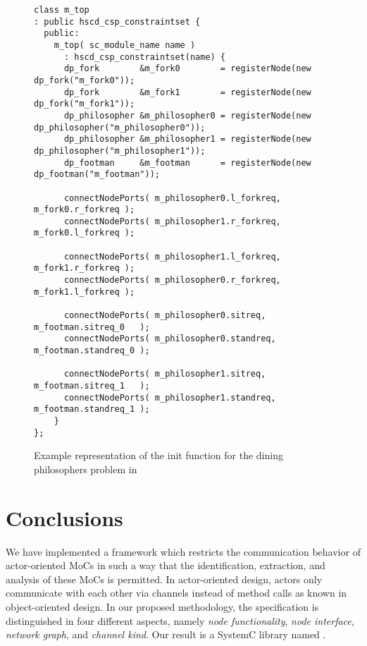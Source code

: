 \begin{figure}
\centering
\begin{verbatim}
class m_top
: public hscd_csp_constraintset {
  public:
    m_top( sc_module_name name )
      : hscd_csp_constraintset(name) {
      dp_fork        &m_fork0        = registerNode(new dp_fork("m_fork0"));
      dp_fork        &m_fork1        = registerNode(new dp_fork("m_fork1"));
      dp_philosopher &m_philosopher0 = registerNode(new dp_philosopher("m_philosopher0"));
      dp_philosopher &m_philosopher1 = registerNode(new dp_philosopher("m_philosopher1"));
      dp_footman     &m_footman      = registerNode(new dp_footman("m_footman"));
      
      connectNodePorts( m_philosopher0.l_forkreq, m_fork0.r_forkreq );
      connectNodePorts( m_philosopher1.r_forkreq, m_fork0.l_forkreq );
      
      connectNodePorts( m_philosopher1.l_forkreq, m_fork1.r_forkreq );
      connectNodePorts( m_philosopher0.r_forkreq, m_fork1.l_forkreq );
      
      connectNodePorts( m_philosopher0.sitreq,   m_footman.sitreq_0   );
      connectNodePorts( m_philosopher0.standreq, m_footman.standreq_0 );

      connectNodePorts( m_philosopher1.sitreq,   m_footman.sitreq_1   );
      connectNodePorts( m_philosopher1.standreq, m_footman.standreq_1 );
    }
};
\end{verbatim}
\caption{\label{dining-philosophers-csp-systemoc}
  Example representation of the init function for the
  dining philosophers problem in \SysteMoC{}}
\end{figure}

\section{Conclusions}\label{conclusions}

We have implemented a framework which restricts
the communication behavior of actor-oriented MoCs in such a way that the identification,
extraction, and analysis of these MoCs is permitted.
In actor-oriented design, actors only
communicate with each other via channels instead of method calls as known
in object-oriented design. In our proposed methodology, the specification is
distinguished in four different aspects,
namely \emph{node functionality}, \emph{node interface}, \emph{network graph}, and
\emph{channel kind}. Our result is a SystemC library named \SysteMoC{}.

\clearpage
\appendix




